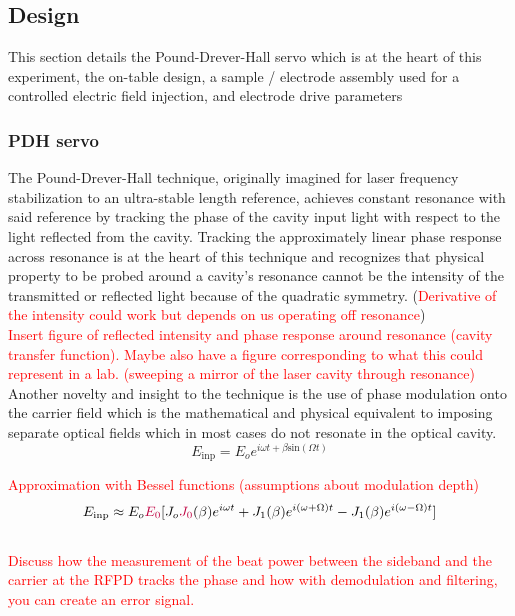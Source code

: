 \subsection{Design}
This section details the Pound-Drever-Hall servo which is at the heart of this experiment, the on-table design, a sample / electrode assembly used for a controlled electric field injection, and electrode drive parameters
\subsubsection{PDH servo}
The Pound-Drever-Hall technique, originally imagined for laser frequency stabilization to an ultra-stable length reference, achieves constant resonance with said reference by tracking the phase of the cavity input light with respect to the light reflected from the cavity. Tracking the approximately linear phase response across resonance is at the heart of this technique and recognizes that physical property to be probed around a cavity's resonance cannot be the intensity of the transmitted or reflected light because of the quadratic symmetry. (\textcolor{red}{Derivative of the intensity could work but depends on us operating off resonance})
\\
\textcolor{red}{Insert figure of reflected intensity and phase response around resonance (cavity transfer function). Maybe also have a figure corresponding to what this could represent in a lab. (sweeping a mirror of the laser cavity through resonance)}
\\
Another novelty and insight to the technique is the use of phase modulation onto the carrier field which is the mathematical and physical equivalent to imposing separate optical fields which in most cases do not resonate in the optical cavity.
\\
\begin{equation}
E_\mathrm{inp} = E_o e^{i \omega t + \beta \mathrm{sin}( \Omega t)}
\end{equation}

\textcolor{red}{Approximation with Bessel functions (assumptions about modulation depth)}
\begin{equation}
E_\mathrm{inp} \approx E_o \textcolor{purple}{E_0} [J_o\textcolor{purple}{J_0}(\beta)e^{i \omega t} + J_1(\beta)e^{i (\omega + \Omega) t} - J_1(\beta)e^{i(\omega -\Omega)t}]
\end{equation}
\\
\textcolor{red}{Discuss how the measurement of the beat power between the sideband and the carrier at the RFPD tracks the phase and how with demodulation and filtering, you can create an error signal.}

